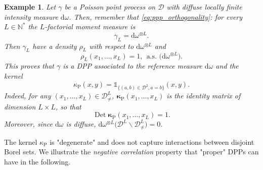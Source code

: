 \documentclass[twoside,11pt]{book}
\newtheorem{example}{Example}
\numberwithin{theorem}{chapter}
\numberwithin{definition}{chapter}
\numberwithin{proposition}{chapter}
\numberwithin{corollary}{chapter}
\numberwithin{example}{chapter}
\numberwithin{lemma}{chapter}
\numberwithin{assumption}{chapter}
\numberwithin{equation}{chapter}
\numberwithin{figure}{chapter}
\DeclareMathOperator{\Det}{Det}
\begin{document}
\begin{example}
Let $\gamma$ be a Poisson point process on $\mathcal{D}$ with diffuse locally finite intensity measure $\mathrm{d}\omega$. Then, remember that \eqref{eq:ppp_orthogonality}: for every $L \in \mathbb{N}^{*}$ the $L$-factorial moment measure is 
\begin{equation}\label{eq:poisson_gamma_L_is_a_DPP}
\gamma_{L} = \mathrm{d}\omega^{\otimes L}.
\end{equation}
Then $\gamma_{L}$ have a density $\rho_{L}$ with respect to $\mathrm{d}\omega^{\otimes L}$ and
\begin{equation}
\rho_L(x_{1}, \dots, x_{L}) = 1, \:\: \text{a.s. (} \mathrm{d}\omega^{\otimes L} \text{)} .
\end{equation}
This proves that $\gamma$ is a DPP associated to the reference measure $\mathrm{d}\omega$ and the kernel
\begin{equation}\label{eq:the_degenerate_poisson_kernel}
\kappa_{\mathrm{P}}(x,y) = \mathbb{1}_{\{(a,b) \in \mathcal{D}^{2}, a=b \}}(x,y).
\end{equation}
Indeed, for any $(x_{1}, \dots, x_{L}) \in \mathcal{D}^{L}_{\neq} $, $\bm{\kappa}_{\mathrm{P}}(x_{1}, \dots, x_{L})$ is the identity matrix of dimension $L \times L$, so that
\begin{equation}
\Det \bm{\kappa}_{\mathrm{P}}(x_{1}, \dots, x_{L}) = 1.
\end{equation}
Moreover, since $\mathrm{d}\omega$ is diffuse, $\mathrm{d}\omega ^{\otimes L} \Big( \mathcal{D}^{L} \smallsetminus \mathcal{D}^{L}_{\neq} \Big) = 0$. 

\end{example}

The kernel $\kappa_{\mathrm{P}}$ is "degenerate" and does not capture interactions between disjoint Borel sets.
We illustrate the \emph{negative correlation} property that "proper" DPPs can have in the following.
\end{document}
